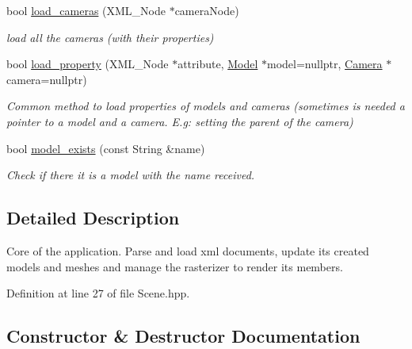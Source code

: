\begin{DoxyCompactItemize}
bool \mbox{\hyperlink{classprzurro_1_1_scene_aafbe64cd67261b27b15fa3219027455e}{load\+\_\+cameras}} (X\+M\+L\+\_\+\+Node $\ast$camera\+Node)
\begin{DoxyCompactList}\small\item\em load all the cameras (with their properties) \end{DoxyCompactList}\item 
bool \mbox{\hyperlink{classprzurro_1_1_scene_a62b094d029473e81e2bcc43d7bc01777}{load\+\_\+property}} (X\+M\+L\+\_\+\+Node $\ast$attribute, \mbox{\hyperlink{classprzurro_1_1_model}{Model}} $\ast$model=nullptr, \mbox{\hyperlink{classprzurro_1_1_camera}{Camera}} $\ast$camera=nullptr)
\begin{DoxyCompactList}\small\item\em Common method to load properties of models and cameras (sometimes is needed a pointer to a model and a camera. E.\+g\+: setting the parent of the camera) \end{DoxyCompactList}\item 
bool \mbox{\hyperlink{classprzurro_1_1_scene_acd91a4c5188aa41add75a093de32b664}{model\+\_\+exists}} (const String \&name)
\begin{DoxyCompactList}\small\item\em Check if there it is a model with the name received. \end{DoxyCompactList}\end{DoxyCompactItemize}


\subsection{Detailed Description}
Core of the application. Parse and load xml documents, update it\textquotesingle{}s created models and meshes and manage the rasterizer to render it\textquotesingle{}s members. 



Definition at line 27 of file Scene.\+hpp.



\subsection{Constructor \& Destructor Documentation}
\mbox{\label{classprzurro_1_1_scene_aac84c8cfd0f26b897805f8af37dccd22}} 
